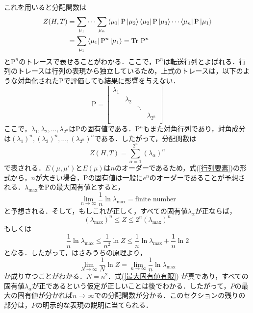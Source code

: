 \documentclass[a4paper,11pt]{jsreport}
\begin{document}
これを用いると分配関数は
\begin{align}
  Z(H,T)
   & = \sum_{\mu_1} \cdots \sum_{\mu_n} \bra{\mu_1} \mathrm{P} \ket{\mu_2}\bra{\mu_2} \mathrm{P} \ket{\mu_3}\cdots\bra{\mu_n} \mathrm{P} \ket{\mu_1} \\
   & = \sum_{\mu_1}\bra{\mu_1} \mathrm{P}^n \ket{\mu_1} = \mathrm{Tr} \ \mathrm{P}^n
\end{align}
と$\mathrm{P}^n$のトレースで表せることがわかる．ここで，$\mathrm{P}^n$は転送行列とよばれる．行列のトレースは行列の表現から独立しているため，上式のトレースは，以下のような対角化された$\mathrm{P}$で評価しても結果に影響を与えない．
\begin{equation}
  \mathrm{P} = \begin{bmatrix}
    \lambda_1 &           &        &               \\
              & \lambda_2 &        &               \\
              &           & \ddots &               \\
              &           &        & \lambda_{2^n} \\
  \end{bmatrix}
\end{equation}
ここで，$\lambda_1, \lambda_2, \dots, \lambda_{2^n}$は$\mathrm{P}$の固有値である．$\mathrm{P}^n$もまた対角行列であり，対角成分は$(\lambda_1)^n, (\lambda_2)^n, \dots, (\lambda_{2^n})^n$である．したがって，分配関数は
\begin{equation}
  Z(H,T)
  = \sum_{\alpha=1}^{2^n} (\lambda_\alpha)^n
\end{equation}
で表される．$E(\mu, \mu')$と$E(\mu)$は$n$のオーダーであるため，式(\ref{行列要素})の形式から，$n$が大きい場合，$\mathrm{P}$の固有値は一般に$e^n$のオーダーであることが予想される．$\lambda_{\text{max}}$を$\mathrm{P}$の最大固有値とすると，
\begin{equation}
  \lim_{n \rightarrow \infty} \frac{1}{n} \ln{\lambda}_{\text{max}}
  = \text{finite number}
  \label{最大固有値有限}
\end{equation}
と予想される．そして，もしこれが正しく，すべての固有値$\lambda_{\alpha}$が正ならば，
\begin{equation}
  (\lambda_{\text{max}})^n \leq Z \leq 2^n (\lambda_{\max})^n
\end{equation}
もしくは
\begin{equation}
  \frac{1}{n}\ln{\lambda_{\text{max}}}
  \leq \frac{1}{n^2}\ln{Z}
  \leq \frac{1}{n}\ln{\lambda_{\text{max}}} + \frac{1}{n} \ln{2}
\end{equation}
となる．したがって，はさみうちの原理より，
\begin{equation}
  \lim_{N \rightarrow \infty} \frac{1}{N} \ln{Z}
  = \lim_{n \rightarrow \infty} \frac{1}{n} \ln{\lambda_{\text{max}}}
  \label{n極限}
\end{equation}
か成り立つことがわかる．$N=n^2$．式(\ref{最大固有値有限}) が真であり，すべての固有値$\lambda_{\alpha}$が正であるという仮定が正しいことは後でわかる．したがって，$P$の最大の固有値が分かれば$n \rightarrow \infty$での分配関数が分かる．このセクションの残りの部分は，$P$の明示的な表現の説明に当てられる．
\end{document}

